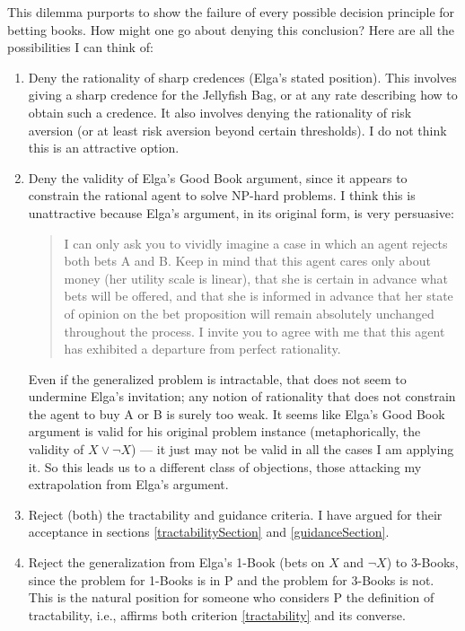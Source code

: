 \documentclass[letterpaper,12pt]{article}
\begin{document}
This dilemma purports to show the failure of every possible decision principle for betting books. How might one go about denying this conclusion? Here are all the possibilities I can think of:

\begin{enumerate}
\item
Deny the rationality of sharp credences (Elga's stated position). This involves giving a sharp credence for the Jellyfish Bag, or at any rate describing how to obtain such a credence. It also involves denying the rationality of risk aversion (or at least risk aversion beyond certain thresholds). I do not think this is an attractive option.
\item
Deny the validity of Elga's Good Book argument, since it appears to constrain the rational agent to solve NP-hard problems. I think this is unattractive because Elga's argument, in its original form, is very persuasive:
\begin{quote}
I can only ask you to vividly imagine a case in which an agent rejects both bets A and B. Keep in mind that this agent cares only about money (her utility scale is linear), that she is certain in advance what bets will be offered, and that she is informed in advance that her state of opinion on the bet proposition will remain absolutely unchanged throughout the process. I invite you to agree with me that this agent has exhibited a departure from perfect rationality.
\end{quote}
Even if the generalized problem is intractable, that does not seem to undermine Elga's invitation; any notion of rationality that does not constrain the agent to buy A or B is surely too weak. It seems like Elga's Good Book argument is valid for his original problem instance (metaphorically, the validity of $X \lor \neg X$) --- it just may not be valid in all the cases I am applying it. So this leads us to a different class of objections, those attacking my extrapolation from Elga's argument.
\item
Reject (both) the tractability and guidance criteria. I have argued for their acceptance in sections \ref{tractabilitySection} and \ref{guidanceSection}.
\item
Reject the generalization from Elga's 1-Book (bets on $X$ and $\neg X$) to 3-Books, since the problem for 1-Books is in P and the problem for 3-Books is not. This is the natural position for someone who considers P the definition of tractability, i.e., affirms both criterion \ref{tractability} and its converse.


\end{enumerate}
\end{document}
